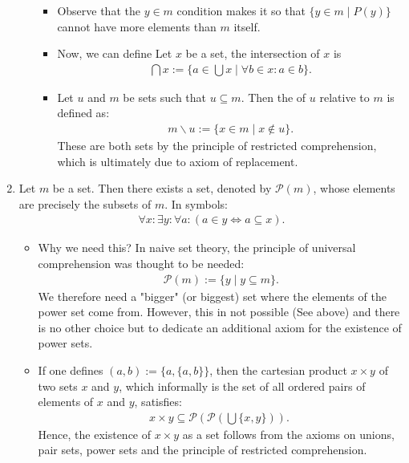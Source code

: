 \documentclass{article}
\begin{document}
\begin{enumerate}
\begin{itemize}
\begin{itemize}[$\ast$]
\item Observe that the $y \in m$ condition makes it so that $\{y \in m \mid P(y)\}$ cannot have more elements than $m$ itself.
    \item Now, we can define  Let $x$ be a set, the intersection of $x$ is
\begin{align*}
\bigcap x:=\{a \in \bigcup x \mid \forall b \in x: a \in b\} .
\end{align*}
\item  Let $u$ and $m$ be sets such that $u \subseteq m$. Then the  of $u$ relative to $m$ is defined as:
\begin{align*}
m \backslash u:=\{x \in m \mid x \notin u\} .
\end{align*}
These are both sets by the principle of restricted comprehension, which is ultimately due to axiom of replacement.
\end{itemize}


\end{itemize}
\item {} Let $m$ be a set. Then there exists a set, denoted by $\mathcal{P}(m)$, whose elements are precisely the subsets of $m$. In symbols:
\begin{align*}
\forall x: \exists y: \forall a:(a \in y \Leftrightarrow a \subseteq x) .
\end{align*}

\begin{itemize}
\item Why we need this?  In naive set theory, the principle of universal comprehension was thought to be needed:
\begin{align*}
\mathcal{P}(m):=\{y \mid y \subseteq m\} .
\end{align*}
We therefore need a "bigger" (or biggest) set where the elements of the power set come from. However, this in not possible (See above) and there is no other choice but to dedicate an additional axiom for the existence of power sets.

    \item If one defines $(a, b):=\{a,\{a, b\}\}$, then the cartesian product $x \times y$ of two sets $x$ and $y$, which informally is the set of all ordered pairs of elements of $x$ and $y$, satisfies:
\begin{align*}
x \times y \subseteq \mathcal{P}(\mathcal{P}(\bigcup\{x, y\})) \text {. }
\end{align*}
Hence, the existence of $x \times y$ as a set follows from the axioms on unions, pair sets, power sets and the principle of restricted comprehension.


\end{itemize}
\end{enumerate}
\end{document}
